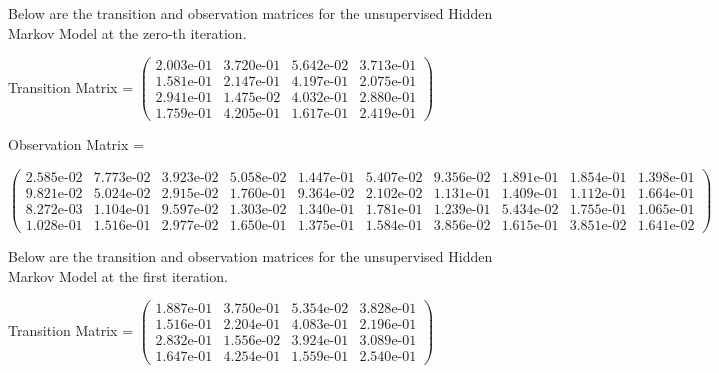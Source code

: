 Below are the transition and observation matrices for the unsupervised Hidden Markov Model at the zero-th iteration.

Transition Matrix = \small $\begin{pmatrix}
2.003\text{e-}01 & 3.720\text{e-}01 & 5.642\text{e-}02 & 3.713\text{e-}01\\
1.581\text{e-}01 & 2.147\text{e-}01 & 4.197\text{e-}01 & 2.075\text{e-}01\\
2.941\text{e-}01 & 1.475\text{e-}02 & 4.032\text{e-}01 & 2.880\text{e-}01\\
1.759\text{e-}01 & 4.205\text{e-}01 & 1.617\text{e-}01 & 2.419\text{e-}01 
\end{pmatrix}$
\normalsize

Observation Matrix =

\small
$\begin{pmatrix}
2.585\text{e-}02 & 7.773\text{e-}02 & 3.923\text{e-}02 & 5.058\text{e-}02 & 1.447\text{e-}01 & 5.407\text{e-}02 & 9.356\text{e-}02 & 1.891\text{e-}01 & 1.854\text{e-}01 & 1.398\text{e-}01\\
9.821\text{e-}02 & 5.024\text{e-}02 & 2.915\text{e-}02 & 1.760\text{e-}01 & 9.364\text{e-}02 & 2.102\text{e-}02 & 1.131\text{e-}01 & 1.409\text{e-}01 & 1.112\text{e-}01 & 1.664\text{e-}01\\
8.272\text{e-}03 & 1.104\text{e-}01 & 9.597\text{e-}02 & 1.303\text{e-}02 & 1.340\text{e-}01 & 1.781\text{e-}01 & 1.239\text{e-}01 & 5.434\text{e-}02 & 1.755\text{e-}01 & 1.065\text{e-}01\\
1.028\text{e-}01 & 1.516\text{e-}01 & 2.977\text{e-}02 & 1.650\text{e-}01 & 1.375\text{e-}01 & 1.584\text{e-}01 & 3.856\text{e-}02 & 1.615\text{e-}01 & 3.851\text{e-}02 & 1.641\text{e-}02 
\end{pmatrix}$
\normalsize
\medskip

Below are the transition and observation matrices for the unsupervised Hidden Markov Model at the first iteration.

Transition Matrix = \small $\begin{pmatrix}
1.887\text{e-}01 & 3.750\text{e-}01 & 5.354\text{e-}02 & 3.828\text{e-}01\\
1.516\text{e-}01 & 2.204\text{e-}01 & 4.083\text{e-}01 & 2.196\text{e-}01\\
2.832\text{e-}01 & 1.556\text{e-}02 & 3.924\text{e-}01 & 3.089\text{e-}01\\
1.647\text{e-}01 & 4.254\text{e-}01 & 1.559\text{e-}01 & 2.540\text{e-}01   
\end{pmatrix}$
\normalsize

